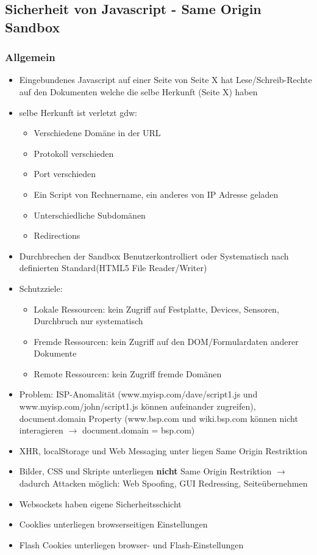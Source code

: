 \documentclass{article} %
\begin{document}
	
	\subsection{Sicherheit von Javascript - Same Origin Sandbox}
	\subsubsection{Allgemein}
	\begin{itemize}
		\item Eingebundenes Javascript auf einer Seite von Seite X hat Lese/Schreib-Rechte auf den Dokumenten welche die selbe Herkunft (Seite X) haben
		\item selbe Herkunft ist verletzt gdw:
		\begin{itemize}
			\item Verschiedene Domäne in der URL
			\item Protokoll verschieden
			\item Port verschieden
			\item Ein Script von Rechnername, ein anderes von IP Adresse geladen
			\item Unterschiedliche Subdomänen
			\item Redirections
		\end{itemize}
		\item Durchbrechen der Sandbox Benutzerkontrolliert oder Systematisch nach definierten Standard(HTML5 File Reader/Writer)
		\item Schutzziele:
		\begin{itemize}
			\item Lokale Ressourcen: kein Zugriff auf Festplatte, Devices, Sensoren, Durchbruch nur systematisch
			\item Fremde Ressourcen: kein Zugriff auf den DOM/Formulardaten anderer Dokumente
			\item Remote Ressourcen: kein Zugriff fremde Domänen
		\end{itemize}
		\item Problem: ISP-Anomalität (www.myisp.com/dave/script1.js und www.myisp.com/john/script1.js können aufeinander zugreifen), document.domain Property (www.bsp.com und wiki.bsp.com können nicht interagieren $\rightarrow$ document.domain = \glqq bsp.com\grqq)
		\item XHR, localStorage und Web Messaging unter liegen Same Origin Restriktion
		\item Bilder, CSS und Skripte unterliegen \textbf{nicht} Same Origin Restriktion $\rightarrow$ dadurch Attacken möglich: Web Spoofing, GUI Redressing, Seiteübernehmen
		\item Websockets haben eigene Sicherheitsschicht
		\item Cooklies unterliegen browserseitigen Einstellungen
		\item Flash Cookies unterliegen browser- und Flash-Einstellungen
	\end{itemize}
\end{document}
